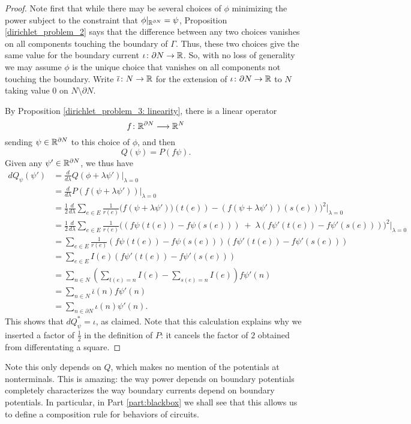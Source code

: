 \begin{proof}
Note first that while there may be several choices of $\phi$ minimizing the power subject to the constraint that $\phi|_{{\mathbb{R}}^{\partial N}} = \psi$, Proposition \ref{dirichlet_problem_2} says that the difference between any two choices vanishes on all components touching the boundary of $\Gamma$.  Thus, these two choices give the same value for the boundary current $\iota{\colon} \partial N \to {\mathbb{R}}$. So, with no loss of generality we may assume $\phi$ is the unique choice that vanishes on all components not touching the boundary. Write $\overline\iota{\colon} N \to {\mathbb{R}}$ for the extension of $\iota{\colon} \partial N \to {\mathbb{R}}$ to $N$ taking value $0$ on $N \setminus \partial N$. 

By Proposition \ref{dirichlet_problem_3: linearity}, there is a linear operator
\[
f{\colon} {\mathbb{R}}^{\partial N} \longrightarrow {\mathbb{R}}^N
\]
sending $\psi \in {\mathbb{R}}^{\partial N}$ to this choice of $\phi$, and then
\[
Q(\psi) = P(f\psi).
\]
Given any $\psi' \in {\mathbb{R}}^{\partial N}$, we thus have
\begin{align*}
dQ_\psi(\psi') &= \frac{d}{d\lambda}Q(\phi +\lambda\psi') \bigg|_{\lambda=0} \\
&= \frac{d}{d\lambda}P(f(\psi+\lambda\psi'))\bigg|_{\lambda=0} \\
&= \frac{1}{2} \frac{d}{d\lambda}\sum_{e \in E} \frac1{r(e)}\bigg(f(\psi+\lambda\psi'))(t(e))-(f(\psi+\lambda\psi'))(s(e))\bigg)^2 \bigg|_{\lambda=0} \\
&= \frac{1}{2} \frac{d}{d\lambda}\sum_{e \in E} \frac1{r(e)}\bigg((f\psi(t(e))-f\psi(s(e))) \;+\;\lambda (f\psi'(t(e))- f\psi'(s(e)))\bigg)^2 \bigg|_{\lambda=0} \\
&= \sum_{e \in E} \frac1{r(e)}(f\psi(t(e))-f\psi(s(e)))(f\psi'(t(e))- f\psi'(s(e))) \\
&= \sum_{e \in E} I(e)(f\psi'(t(e))- f\psi'(s(e))) \\
&= \sum_{n \in N}\left(\sum_{t(e) = n} I(e) - \sum_{s(e) = n} I(e)\right)f\psi'(n) \\
&= \sum_{n \in N}\overline \iota(n) f\psi'(n) \\
&= \sum_{n \in \partial N}\iota(n) \psi'(n).
\end{align*}
This shows that $dQ_\psi^\ast = \iota$, as claimed.  Note that this calculation explains why we inserted a factor of $\frac{1}{2}$ in the definition of $P$: it cancels the factor of $2$ obtained from differentating a square.
 \end{proof}

Note this only depends on $Q$, which makes no mention of the potentials at
nonterminals. This is amazing: the way power depends on boundary potentials
completely characterizes the way boundary currents depend on boundary
potentials. In particular, in Part \ref{part:blackbox} we shall see that this
allows us to define a composition rule for behaviors of circuits.


